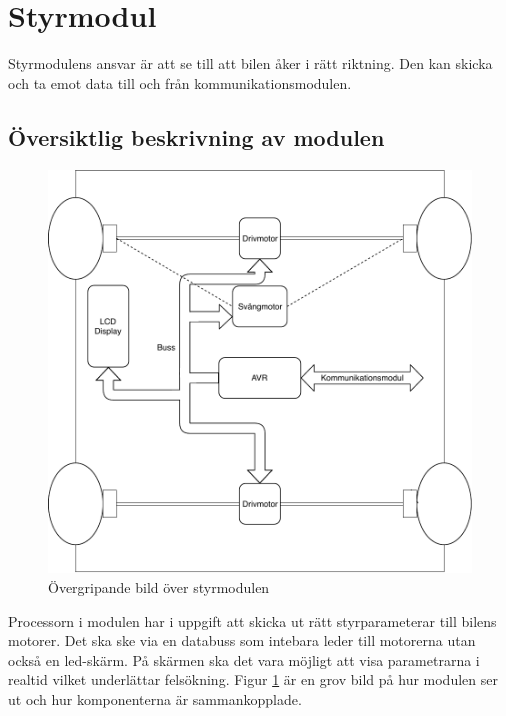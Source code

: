 \documentclass[systemskiss/skiss.tex]{subfiles}
\begin{document}
\section{Styrmodul}
Styrmodulens ansvar är att se till att bilen åker i rätt riktning. Den kan skicka och ta emot data till och från kommunikationsmodulen. 
\subsection{Översiktlig beskrivning av modulen}
\begin{figure}[h]
    \centering
    \includegraphics[width=0.6\linewidth]{systemskiss/figures/styrmodul.pdf}
    \caption{Övergripande bild över styrmodulen}
    \label{fig:styrskiss}
\end{figure}

Processorn i modulen har i uppgift att skicka ut rätt styrparameterar till bilens motorer. Det ska ske via en databuss som intebara leder till motorerna utan också en led-skärm. På skärmen ska det vara möjligt att visa parametrarna i realtid vilket underlättar felsökning. Figur \ref{fig:styrskiss} är en grov bild på hur modulen ser ut och hur komponenterna är sammankopplade.
\end{document}
